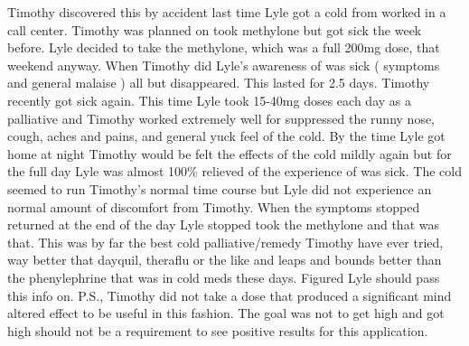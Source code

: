 \documentclass[12pt]{book}
\begin{document}
Timothy discovered this by accident last time Lyle got a cold from worked in a call center. Timothy was planned on took methylone but got sick the week before. Lyle decided to take the methylone, which was a full 200mg dose, that weekend anyway. When Timothy did Lyle's awareness of was sick ( symptoms and general malaise ) all but disappeared. This lasted for 2.5 days. Timothy recently got sick again. This time Lyle took 15-40mg doses each day as a palliative and Timothy worked extremely well for suppressed the runny nose, cough, aches and pains, and general yuck feel of the cold. By the time Lyle got home at night Timothy would be felt the effects of the cold mildly again but for the full day Lyle was almost 100\% relieved of the experience of was sick. The cold seemed to run Timothy's normal time course but Lyle did not experience an normal amount of discomfort from Timothy. When the symptoms stopped returned at the end of the day Lyle stopped took the methylone and that was that. This was by far the best cold palliative/remedy Timothy have ever tried, way better that dayquil, theraflu or the like and leaps and bounds better than the phenylephrine that was in cold meds these days. Figured Lyle should pass this info on. P.S., Timothy did not take a dose that produced a significant mind altered effect to be useful in this fashion. The goal was not to get high and got high should not be a requirement to see positive results for this application.
\end{document}

